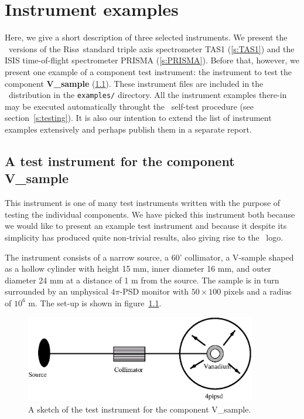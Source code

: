 
\chapter{Instrument examples}
\label{s:instrument}

Here, we give a short description of three selected
instruments. We present the \MCS\ versions of
the Ris\o\ standard triple axis spectrometer TAS1 (\ref{s:TAS1})
and the ISIS time-of-flight spectrometer PRISMA (\ref{s:PRISMA}).
Before that, however, we present one example of a component
test instrument: the instrument to test the component
{\bf V\_sample} (\ref{s:V-instr}).
%
These instrument files are included in the \MCS\ distribution
in the \verb+examples/+ directory.
All the instrument examples there-in may be executed automatically throught the \MCS\ self-test procedure (see section~\ref{s:testing}).
It is also our intention to extend the list of instrument examples extensively
and perhaps publish them in a separate report.

\section{A test instrument for the component V\_sample}
\label{s:V-instr}
This instrument is one of many test instruments written with the
purpose of testing the individual components. We have picked 
this instrument both because we would like to present an
example test instrument and because it despite its simplicity
has produced quite non-trivial results, also giving rise to 
the \MCS\ logo.%

The instrument consists of a narrow source, 
a 60' collimator, a V-sample shaped as a hollow cylinder
with height 15 mm, inner diameter 16 mm, and outer diameter 24 mm
at a distance of 1 m from the source. 
The sample is in turn surrounded by an unphysical $4\pi$-PSD
monitor with $50 \times 100$ pixels and a radius of $10^{6}$ m. 
The set-up is shown in figure~\ref{f:V-instr}.

\begin{figure}
  \begin{center}
    \includegraphics[width=0.9\textwidth]{figures/vanadium.eps}
  \end{center}
\caption{A sketch of the test instrument for the component
V\_sample.}
\label{f:V-instr}
\end{figure}


